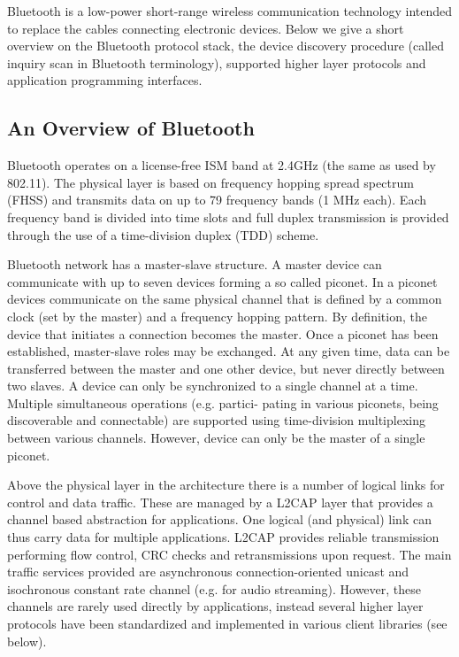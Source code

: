 Bluetooth is a low-power short-range wireless communication technology intended to replace the cables connecting electronic devices. Below we give a short overview on the Bluetooth protocol stack, the device discovery procedure (called inquiry scan in Bluetooth terminology), supported higher layer protocols and application programming interfaces.

\subsection{An Overview of Bluetooth}

Bluetooth operates on a license-free ISM band at 2.4GHz (the same as used by 802.11). The physical layer is based on frequency hopping spread spectrum (FHSS) and transmits data on up to 79 frequency bands (1 MHz each). Each frequency band is divided into time slots and full duplex transmission is provided through the use of a time-division duplex (TDD) scheme.

Bluetooth network has a master-slave structure. A master device can communicate with up to seven devices forming a so called piconet. In a piconet devices communicate on the same physical channel that is defined by a common clock (set by the master) and a frequency hopping pattern. By definition, the device that initiates a connection becomes the master. Once a piconet has been established, master-slave roles may be exchanged. At any given time, data can be transferred between the master and one other device, but never directly between two slaves. A device can only be synchronized to a single channel at a time. Multiple simultaneous operations (e.g. partici-
pating in various piconets, being discoverable and connectable) are supported using time-division multiplexing between various channels. However, device can only be the master of a single piconet.

Above the physical layer in the architecture there is a number of logical links for control and data traffic. These are managed by a L2CAP layer that provides a channel based abstraction for applications. One logical (and physical) link can thus carry data for multiple applications. L2CAP provides reliable transmission performing flow control, CRC checks and retransmissions upon request. The main traffic services provided are asynchronous connection-oriented unicast and isochronous constant rate channel (e.g. for audio streaming). However, these channels are rarely used directly by applications, instead several higher layer protocols have been standardized and implemented in various client libraries (see below). 

